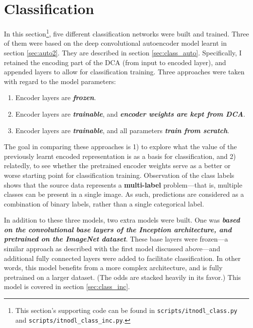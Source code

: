 

\section{Classification}
\label{sec:class}





In this section\footnote{This section's supporting code can be found in \texttt{scripts/itnodl\_class.py} and \texttt{scripts/itnodl\_class\_inc.py}.}, five different classification networks were built and trained. Three of them were based on the deep convolutional autoencoder model learnt in section \textcolor{blue}{\ref{sec:auto2}}. They are described in section \textcolor{blue}{\ref{sec:class_auto}}. Specifically, I retained the encoding part of the DCA (from input to encoded layer), and appended layers to allow for classification training. Three approaches were taken with regard to the model parameters:

\begin{enumerate}

	\item{Encoder layers are \textbf{\textsl{frozen}}.}
	\item{Encoder layers are \textbf{\textsl{trainable}}, and \textbf{\textsl{encoder weights are kept from DCA}}.}
	\item{Encoder layers are \textbf{\textsl{trainable}}, and all parameters \textbf{\textsl{train from scratch}}.}

\end{enumerate}

The goal in comparing these approaches is 1) to explore what the value of the previously learnt encoded representation is as a basis for classification, and 2) relatedly, to see whether the pretrained encoder weights serve as a better or worse starting point for classification training. Observation of the class labels shows that the source data represents a \textbf{multi-label} problem---that is, multiple classes can be present in a single image. As such, predictions are considered as a combination of binary labels, rather than a single categorical label. 

\vspace{5mm}

In addition to these three models, two extra models were built. One was \textbf{\textsl{based on the convolutional base layers of the Inception architecture, and pretrained on the ImageNet dataset}}. These base layers were frozen---a similar approach as described with the first model discussed above---and additional fully connected layers were added to facilitate classification. In other words, this model benefits from a more complex architecture, and is fully pretrained on a larger dataset. (The odds are stacked heavily in its favor.) This model is covered in section \textcolor{blue}{\ref{sec:class_inc}}.

